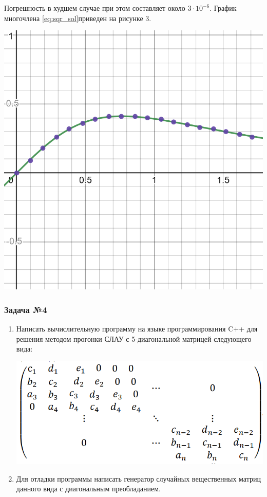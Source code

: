\documentclass[a4paper, fontsize=14pt]{article}
\begin{document}
Погрешность в худшем случае при этом составляет около $3 \cdot 10^{-6}$. График многочлена \eqref{eq:sqr_sol}приведен на рисунке 3.
\begin{center}
    \includegraphics[scale=0.3]{src/least_sqr_des.png}
\end{center}

\subsubsection*{Задача №4}
\begin{enumerate}
    \item Написать вычислительную программу на языке программирования C++
          для решения методом прогонки СЛАУ с 5-диагональной матрицей
          следующего вида:
          \begin{center}
              \includegraphics[]{src/pentadiagonal.png}
          \end{center}
    \item Для отладки программы написать генератор случайных вещественных
          матриц данного вида с диагональным преобладанием.
\end{enumerate}
\end{document}
